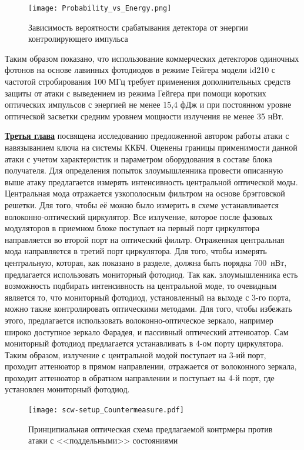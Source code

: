 \begin{figure}[ht]
  \centering
  \texttt{[image: Probability\_vs\_Energy.png]}
  \caption{Зависимость вероятности срабатывания детектора от энергии контролирующего импульса}
  \label{fig:Probability_vs_Energy}
\end{figure}


Таким образом показано, что использование коммерческих детекторов одиночных фотонов на основе лавинных фотодиодов в режиме Гейгера модели id210 с частотой стробирования 100 МГц  требует применения дополнительных средств защиты от атаки с выведением из режима Гейгера при помощи коротких оптических импульсов с энергией не менее 15,4 фДж и при постоянном уровне оптической засветки средним уровнем мощности излучения не менее 35 нВт.  

 \underline{\textbf{Третья глава}} посвящена исследованию предложенной автором работы атаки с навязыванием ключа на системы ККБЧ. Оценены границы применимости данной атаки с учетом характеристик и параметром оборудования в составе блока получателя. Для определения попыток злоумышленника провести описанную выше атаку предлагается измерять интенсивность центральной оптической моды. Центральная мода отражается узкополосным фильтром на основе брэгговской решетки. Для того, чтобы её можно было измерить в схеме устанавливается волоконно-оптический циркулятор. Все излучение, которое после фазовых модуляторов в приемном блоке поступает на первый порт циркулятора направляется во второй порт на оптический фильтр. Отраженная центральная мода направляется в третий порт циркулятора. Для того, чтобы измерять центральную, которая, как показано в разделе, должна быть порядка 700~нВт, предлагается использовать мониторный фотодиод. Так как. злоумышленника есть возможность подбирать интенсивность на центральной моде, то очевидным является то, что мониторный фотодиод, установленный на выходе с 3-го порта, можно также контролировать оптическими методами. Для того, чтобы избежать этого, предлагается использовать волоконно-оптическое зеркало, например широко доступное зеркало Фарадея, и пассивный оптический аттенюатор. Сам мониторный фотодиод предлагается устанавливать в 4-ом порту циркулятора. Таким образом, излучение с центральной модой поступает на 3-ий порт, проходит аттенюатор в прямом направлении, отражается от волоконного зеркала, проходит аттенюатор в обратном направлении и поступает на 4-й порт, где установлен мониторный фотодиод.
 
          
 \begin{figure}[ht]
  \centering
  \texttt{[image: scw-setup\_Countermeasure.pdf]}
  \caption{Принципиальная оптическая схема предлагаемой контрмеры против атаки с <<поддельными>> состояниями}
  \label{fig:countermeasure}
\end{figure}
 
